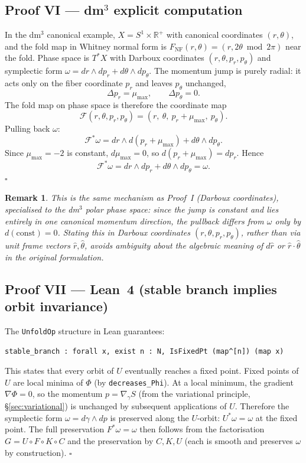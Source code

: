 \documentclass[14pt,a4paper]{extarticle}
\newtheorem{remark}{Remark}[section]
\begin{document}
\subsection*{Proof VI\; — dm$^3$ explicit computation}

In the dm$^3$ canonical example, $X = S^1 \times \mathbb{R}^+$ with
canonical coordinates $(r,\theta)$, and the fold map in Whitney normal
form is $F_{\mathrm{NF}}(r, \theta) = (r, 2\theta \bmod 2\pi)$ near the
fold. Phase space is $T^*X$ with Darboux coordinates
$(r,\theta,p_r,p_\theta)$ and symplectic form
$\omega = dr \wedge dp_r + d\theta \wedge dp_\theta$.
The momentum jump is purely radial: it acts only on the fiber
coordinate $p_r$ and leaves $p_\theta$ unchanged,
\[
  \Delta p_r = \mu_{\max}, \qquad \Delta p_\theta = 0.
\]
The fold map on phase space is therefore the coordinate map
\[
  \mathcal{F}(r,\theta,p_r,p_\theta)
    = (r,\ \theta,\ p_r+\mu_{\max},\ p_\theta).
\]
Pulling back $\omega$:
\[
  \mathcal{F}^*\omega
    = dr \wedge d(p_r+\mu_{\max}) + d\theta \wedge dp_\theta.
\]
Since $\mu_{\max}=-2$ is constant, $d\mu_{\max}=0$, so
$d(p_r+\mu_{\max}) = dp_r$. Hence
\[
  \mathcal{F}^*\omega = dr\wedge dp_r + d\theta\wedge dp_\theta = \omega.
\]
\hfill $\square$

\begin{remark}
This is the same mechanism as Proof~I (Darboux coordinates),
specialised to the dm$^3$ polar phase space: since the jump is
constant and lies entirely in one canonical momentum direction, the
pullback differs from $\omega$ only by $d(\mathrm{const})=0$. Stating
this in Darboux coordinates $(r,\theta,p_r,p_\theta)$, rather than via
unit frame vectors $\hat r,\hat\theta$, avoids ambiguity about the
algebraic meaning of $d\hat r$ or $\hat r\cdot\hat\theta$ in the
original formulation.
\end{remark}

\subsection*{Proof VII\; — Lean~4 (stable branch implies orbit invariance)}

The \texttt{UnfoldOp} structure in Lean guarantees:
\begin{verbatim}
stable_branch : forall x, exist n : N, IsFixedPt (map^[n]) (map x)
\end{verbatim}
This states that every orbit of $U$ eventually reaches a fixed point.
Fixed points of $U$ are local minima of $\Phi$ (by \texttt{decreases\_Phi}).
At a local minimum, the gradient $\nabla\Phi = 0$, so the momentum
$p = \nabla_\gamma S$ (from the variational principle, \S\ref{sec:variational})
is unchanged by subsequent applications of $U$.
Therefore the symplectic form $\omega = d\gamma \wedge dp$ is preserved
along the $U$-orbit: $U^*\omega = \omega$ at the fixed point.
The full preservation $F^*\omega = \omega$ then follows from the
factorisation $G = U \circ F \circ K \circ C$ and the preservation
by $C, K, U$ (each is smooth and preserves $\omega$ by construction).
\hfill $\square$
\end{document}
